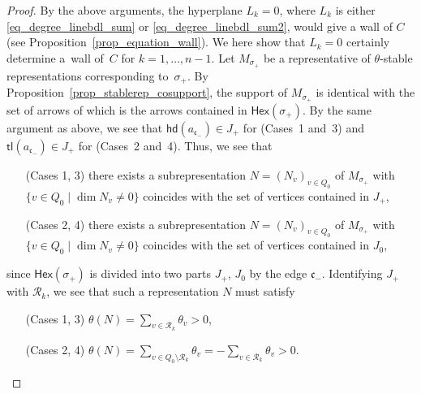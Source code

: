 \documentclass[10pt,a4paper]{amsart}
\numberwithin{equation}{section}
\theoremstyle{definition}
\newcommand{\calR}{\mathcal{R}}
\newcommand{\fkc}{\mathfrak{c}}
\newcommand{\hd}{\mathsf{hd}}
\newcommand{\tl}{\mathsf{tl}}
\newcommand{\Hex}{\mathsf{Hex}}
\begin{document}
\begin{proof}
By the above arguments, the hyperplane $L_k=0$, where $L_k$ is either \eqref{eq_degree_linebdl_sum} or \eqref{eq_degree_linebdl_sum2},
would give a wall of $C$ (see Proposition~\ref{prop_equation_wall}).
We here show that $L_k=0$ certainly determine a~wall of~$C$ for $k=1, \dots, n-1$.
Let $M_{\sigma_+}$ be a representative of $\theta$-stable representations corresponding to~$\sigma_+$.
By Proposition~\ref{prop_stablerep_cosupport}, the support of $M_{\sigma_+}$ is identical with the set of arrows of  which is the arrows contained in $\Hex(\sigma_+)$.
By the same argument as above, we see that $\hd(a_{\fkc_-})\in J_+$ for (Cases~1 and~3) and $\tl(a_{\fkc_-})\in J_+$ for (Cases~2 and~4).
Thus, we see that
\begin{itemize}\setlength{\leftskip}{1.2cm}\itemsep=0pt
\item[(Cases 1, 3)] there exists a subrepresentation $N=(N_v)_{v\in Q_0}$ of $M_{\sigma_+}$
with ${\{v\in Q_0\mid \dim N_v\neq 0\}}$ coincides with the set of vertices contained in $J_+$,
\item[(Cases 2, 4)] there exists a subrepresentation $N=(N_v)_{v\in Q_0}$ of $M_{\sigma_+}$
with $\{{v\in Q_0\mid \dim N_v\neq 0}\}$ coincides with the set of vertices contained in $J_0$,
\end{itemize}
since $\Hex(\sigma_+)$ is divided into two parts $J_+$, $J_0$ by the edge $\fkc_-$.
Identifying $J_+$ with $\calR_k$, we see that such a representation $N$ must satisfy
\begin{itemize}\setlength{\leftskip}{1.2cm}\itemsep=0pt
\item[(Cases 1, 3)] $\theta(N)=\sum_{v\in\calR_k}\theta_v>0$,
\item[(Cases 2, 4)] $\theta(N)=\sum_{v\in Q_0{\setminus}\calR_k}\theta_v=-\sum_{v\in\calR_k}\theta_v>0$.
\end{itemize}


\end{proof}
\end{document}
